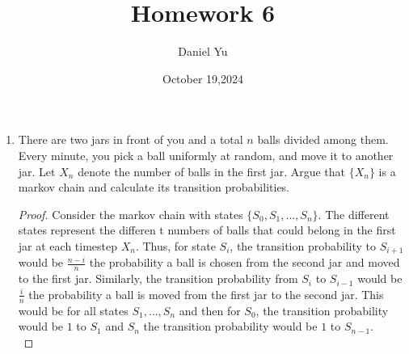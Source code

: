 \documentclass[a4paper]{article}
\title{\Huge{Homework 6}}
\author{\huge{Daniel Yu}}
\date{October 19,2024}
\begin{document}
\maketitle
\newpage%
\pagebreak

\begin{enumerate}
  \item There are two jars in front of you and a total $n$ balls divided among them. Every minute, you pick a ball uniformly at random, and move it to another jar. Let $X_n$ denote the number of balls in the first jar. Argue that  $\{X_n\} $ is a markov chain and calculate its transition probabilities. 
    \begin{proof}
    Consider the markov chain with states $\{S_0, S_1, \ldots, S_n \}$. The different states represent the differen t numbers of balls that could belong in the first jar at each timestep $X_n$. Thus, for state  $S_i$, the transition probability to  $S_{i+1}$ would be $\frac{n-i}{n}$ the probability a ball is chosen from the second jar and moved to the first jar. Similarly, the transition probability from  $S_i$ to  $S_{i-1}$ would be $\frac{i}{n}$ the probability a ball is moved from the first jar to the second jar. This would be for all states $S_1, \ldots, S_n$ and then for  $S_0$, the transition probability would be $1$ to $S_1$ and  $S_n$ the transition probability would be $1$ to  $S_{n-1}$. \\


\end{proof}
\end{enumerate}
\end{document}
